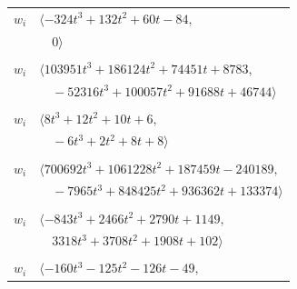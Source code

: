 \documentclass[11pt]{article}
\begin{document}
\begin{longtable}{@{}ll@{}}
$w_i$ & $\langle -324t^{3}+132t^{2}+60t-84,$\\
 & $\quad 0\rangle$\\
\addlinespace[2pt]
\multicolumn{2}{@{}p{0.97\textwidth}@{}}{$i=31$, $D_i=8192$, $\rho_{ij}$: $2{:}2, \allowbreak 3{:}1, \allowbreak 8{:}2, \allowbreak 10{:}2, \allowbreak 12{:}1, \allowbreak 18{:}2, \allowbreak 22{:}2, \allowbreak 26{:}1, \allowbreak 34{:}2, \allowbreak 42{:}1, \allowbreak 45{:}1, \allowbreak 46{:}2, \allowbreak 54{:}2, \allowbreak 55{:}2, \allowbreak 56{:}1$}\\
$w_i$ & $\langle 103951t^{3}+186124t^{2}+74451t+8783,$\\
 & $\quad -52316t^{3}+100057t^{2}+91688t+46744\rangle$\\
\addlinespace[2pt]
\multicolumn{2}{@{}p{0.97\textwidth}@{}}{$i=32$, $D_i=4$, $\rho_{ij}$: $9{:}2, \allowbreak 12{:}1, \allowbreak 27{:}2, \allowbreak 33{:}1, \allowbreak 40{:}1, \allowbreak 44{:}1, \allowbreak 59{:}1$}\\
$w_i$ & $\langle 8t^{3}+12t^{2}+10t+6,$\\
 & $\quad -6t^{3}+2t^{2}+8t+8\rangle$\\
\addlinespace[2pt]
\multicolumn{2}{@{}p{0.97\textwidth}@{}}{$i=33$, $D_i=2048$, $\rho_{ij}$: $8{:}2, \allowbreak 11{:}1, \allowbreak 13{:}2, \allowbreak 17{:}1, \allowbreak 25{:}2, \allowbreak 26{:}1, \allowbreak 29{:}2, \allowbreak 32{:}2, \allowbreak 37{:}2, \allowbreak 43{:}1, \allowbreak 44{:}2, \allowbreak 45{:}2, \allowbreak 46{:}1, \allowbreak 54{:}2, \allowbreak 57{:}2$}\\
$w_i$ & $\langle 700692t^{3}+1061228t^{2}+187459t-240189,$\\
 & $\quad -7965t^{3}+848425t^{2}+936362t+133374\rangle$\\
\addlinespace[2pt]
\multicolumn{2}{@{}p{0.97\textwidth}@{}}{$i=34$, $D_i=256$, $\rho_{ij}$: $13{:}1, \allowbreak 14{:}1, \allowbreak 18{:}1, \allowbreak 20{:}2, \allowbreak 22{:}2, \allowbreak 23{:}2, \allowbreak 31{:}1, \allowbreak 38{:}1, \allowbreak 39{:}2, \allowbreak 55{:}2$}\\
$w_i$ & $\langle -843t^{3}+2466t^{2}+2790t+1149,$\\
 & $\quad 3318t^{3}+3708t^{2}+1908t+102\rangle$\\
\addlinespace[2pt]
\multicolumn{2}{@{}p{0.97\textwidth}@{}}{$i=35$, $D_i=64$, $\rho_{ij}$: $8{:}2, \allowbreak 10{:}2, \allowbreak 11{:}1, \allowbreak 13{:}2, \allowbreak 30{:}2, \allowbreak 37{:}2, \allowbreak 46{:}2, \allowbreak 47{:}2$}\\
$w_i$ & $\langle -160t^{3}-125t^{2}-126t-49,$\\

\end{longtable}
\end{document}

